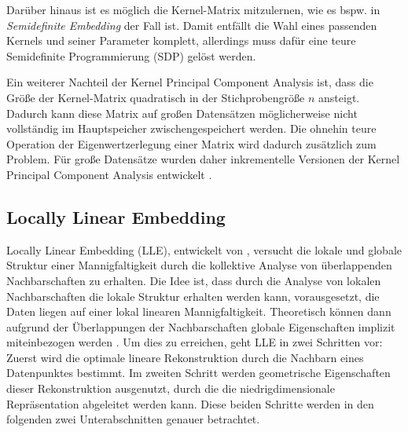 Darüber hinaus ist es möglich die Kernel-Matrix mitzulernen, wie es bspw. in \textit{Semidefinite
	Embedding} \parencite{Weinberger.2004b} der Fall ist. Damit entfällt die Wahl eines passenden Kernels und seiner
Parameter komplett, allerdings muss dafür eine teure Semidefinite Programmierung (SDP) gelöst
werden.

Ein weiterer Nachteil der Kernel Principal Component Analysis ist, dass die Größe der Kernel-Matrix
quadratisch in der Stichprobengröße $n$ ansteigt. Dadurch kann diese Matrix auf großen Datensätzen
möglicherweise nicht vollständig im Hauptspeicher zwischengespeichert werden. Die ohnehin teure
Operation der Eigenwertzerlegung einer Matrix wird dadurch zusätzlich zum Problem. Für große
Datensätze wurden daher inkrementelle Versionen der Kernel Principal Component Analysis entwickelt \parencite[siehe z.B.][]{Hallgren.2018}.

\subsection{Locally Linear Embedding}
\label{ch:MethodenDerDimRed:statistisch:LLE}
Locally Linear Embedding (LLE), entwickelt von \textcite{Roweis.2000}, versucht die lokale und globale Struktur einer Mannigfaltigkeit durch die kollektive Analyse von überlappenden Nachbarschaften zu erhalten. Die Idee ist, dass durch die Analyse von lokalen Nachbarschaften die lokale Struktur erhalten werden kann, vorausgesetzt, die Daten liegen auf einer lokal linearen Mannigfaltigkeit. Theoretisch können dann aufgrund der Überlappungen der Nachbarschaften globale Eigenschaften implizit miteinbezogen werden \parencite[2325]{Roweis.2000}. Um dies zu erreichen, geht LLE in zwei Schritten vor: Zuerst wird die
optimale lineare Rekonstruktion durch die Nachbarn eines Datenpunktes bestimmt. Im zweiten Schritt
werden geometrische Eigenschaften dieser Rekonstruktion ausgenutzt, durch die die
niedrigdimensionale Repräsentation abgeleitet werden kann. Diese beiden Schritte werden in den
folgenden zwei Unterabschnitten genauer betrachtet.

